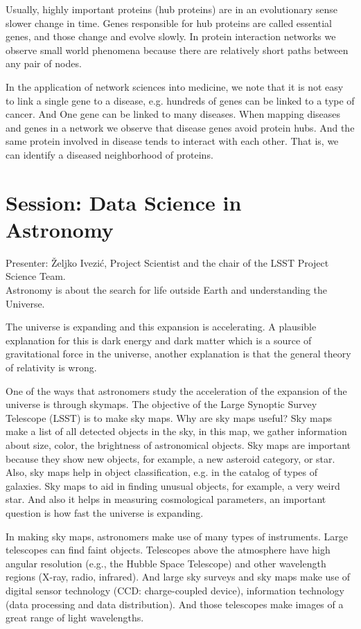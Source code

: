 \documentclass[9pt,a4paper]{article}
\begin{document}
Usually, highly important proteins (hub proteins) are in an evolutionary sense slower change in time. Genes responsible for hub proteins are called essential genes, and those change and evolve slowly. 
In protein interaction networks we observe small world phenomena because there are relatively short paths between any pair of nodes.

In the application of network sciences into medicine, we note that it is not easy to link a single gene to a disease, e.g. hundreds of genes can be linked to a type of cancer. And One gene can be linked to many diseases. When mapping diseases and genes in a network we observe that disease genes avoid protein hubs. And the same protein involved in disease tends to interact with each other. That is, we can identify a diseased neighborhood of proteins.

\section*{Session: Data Science in  Astronomy}

Presenter: Željko  Ivezić, Project Scientist and the chair of the LSST Project Science Team.\\

Astronomy is about the search for life outside Earth and understanding the Universe. 

The universe is expanding and this expansion is accelerating. A plausible explanation for this is dark energy and dark matter which is a source of gravitational force in the universe, another explanation is that the general theory of relativity is wrong.

One of the ways that astronomers study the acceleration of the expansion of the universe is through skymaps. The objective of the Large Synoptic Survey Telescope (LSST) is to make sky maps. Why are sky maps useful? Sky maps make a list of all detected objects in the sky, in this map, we gather information about size, color, the brightness of astronomical objects.
Sky maps are important because they show new objects, for example, a new asteroid category, or star. Also, sky maps help in object classification, e.g. in the catalog of types of galaxies. 
Sky maps to aid in finding unusual objects, for example, a very weird star.
And also it helps in measuring cosmological parameters, an important question is how fast the universe is expanding.

In making sky maps, astronomers make use of many types of instruments. 
Large telescopes can find faint objects.
Telescopes above the atmosphere have high angular resolution (e.g., the Hubble Space Telescope) and other wavelength regions (X-ray, radio, infrared).
And large sky surveys and sky maps make use of digital sensor technology (CCD: charge-coupled device), information technology (data processing and data distribution). And those telescopes make images of a great range of light wavelengths.
\end{document}
